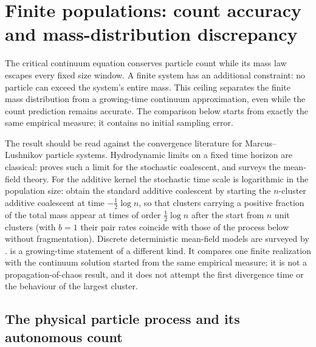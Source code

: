 \section{Finite populations: count accuracy and mass-distribution discrepancy}
\label{sec:finite}

The critical continuum equation conserves particle count while its mass law
escapes every fixed size window. A finite system has an additional constraint:
no particle can exceed the system's entire mass. This ceiling separates the
finite mass distribution from a growing-time continuum approximation, even
while the count prediction remains accurate. The comparison below starts from
exactly the same empirical measure; it contains no initial sampling error.

The result should be read against the convergence literature for
Marcus--Lushnikov particle systems. Hydrodynamic limits on a fixed time
horizon are classical: \citet{Norris1999} proves such a limit for the
stochastic coalescent, and \citet{Aldous1999} surveys the mean-field theory.
For the additive kernel the stochastic time scale is logarithmic in the
population size: \citet{AldousPitman1998} obtain the standard additive
coalescent by starting the $n$-cluster additive coalescent at time
$-\tfrac12\log n$, so that clusters carrying a positive fraction of the total
mass appear at times of order $\tfrac12\log n$ after the start from $n$ unit
clusters (with $b=1$ their pair rates coincide with those of the process
below without fragmentation). Discrete deterministic mean-field models are
surveyed by \citet{Wattis2006}.  is a
growing-time statement of a different kind. It compares one finite
realization with the continuum solution started from the same empirical
measure; it is not a propagation-of-chaos result, and it does not attempt the
first divergence time or the behaviour of the largest cluster.

\subsection{The physical particle process and its autonomous count}

